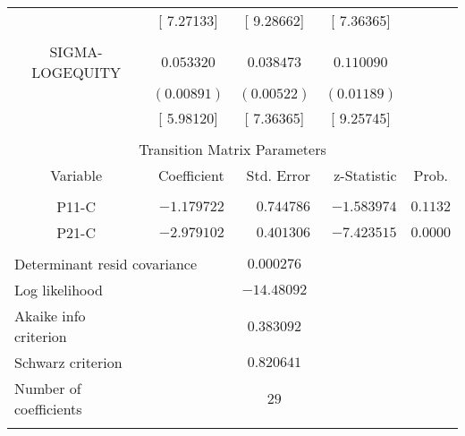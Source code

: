 \begin{tabular}{lrrrr}
\multicolumn{1}{c}{}&\multicolumn{1}{c}{[ 7.27133]}&\multicolumn{1}{c}{[ 9.28662]}&\multicolumn{1}{c}{[ 7.36365]}&\multicolumn{1}{c}{}\\
\multicolumn{1}{c}{}&\multicolumn{1}{c}{}&\multicolumn{1}{c}{}&\multicolumn{1}{c}{}&\multicolumn{1}{c}{}\\
\multicolumn{1}{c}{SIGMA-LOGEQUITY}&\multicolumn{1}{c}{$0.053320$}&\multicolumn{1}{c}{$0.038473$}&\multicolumn{1}{c}{$0.110090$}&\multicolumn{1}{c}{}\\
\multicolumn{1}{c}{}&\multicolumn{1}{c}{$(0.00891)$}&\multicolumn{1}{c}{$(0.00522)$}&\multicolumn{1}{c}{$(0.01189)$}&\multicolumn{1}{c}{}\\
\multicolumn{1}{c}{}&\multicolumn{1}{c}{[ 5.98120]}&\multicolumn{1}{c}{[ 7.36365]}&\multicolumn{1}{c}{[ 9.25745]}&\multicolumn{1}{c}{}\\
[4.5pt] \hline \\ [-4.5pt]
\multicolumn{5}{c}{Transition Matrix Parameters}\\
\multicolumn{1}{c}{Variable}&\multicolumn{1}{r}{Coefficient}&\multicolumn{1}{r}{Std. Error}&\multicolumn{1}{r}{z-Statistic}&\multicolumn{1}{c}{Prob.}\\
[4.5pt] \hline \\ [-4.5pt]
\multicolumn{1}{c}{P11-C}&\multicolumn{1}{r}{$-1.179722$}&\multicolumn{1}{r}{$0.744786$}&\multicolumn{1}{r}{$-1.583974$}&\multicolumn{1}{c}{$0.1132$}\\
\multicolumn{1}{c}{P21-C}&\multicolumn{1}{r}{$-2.979102$}&\multicolumn{1}{r}{$0.401306$}&\multicolumn{1}{r}{$-7.423515$}&\multicolumn{1}{c}{$0.0000$}\\
[4.5pt] \hline \\ [-4.5pt]
\multicolumn{2}{l}{Determinant resid covariance}&\multicolumn{1}{c}{$0.000276$}&\multicolumn{1}{c}{}&\multicolumn{1}{c}{}\\
\multicolumn{1}{l}{Log likelihood}&\multicolumn{1}{c}{}&\multicolumn{1}{c}{$-14.48092$}&\multicolumn{1}{c}{}&\multicolumn{1}{c}{}\\
\multicolumn{1}{l}{Akaike info criterion}&\multicolumn{1}{c}{}&\multicolumn{1}{c}{$0.383092$}&\multicolumn{1}{c}{}&\multicolumn{1}{c}{}\\
\multicolumn{1}{l}{Schwarz criterion}&\multicolumn{1}{c}{}&\multicolumn{1}{c}{$0.820641$}&\multicolumn{1}{c}{}&\multicolumn{1}{c}{}\\
\multicolumn{1}{l}{Number of coefficients}&\multicolumn{1}{c}{}&\multicolumn{1}{c}{$29$}&\multicolumn{1}{c}{}&\multicolumn{1}{c}{}\\
[4.5pt] \hline \\ [-4.5pt]
\end{tabular}